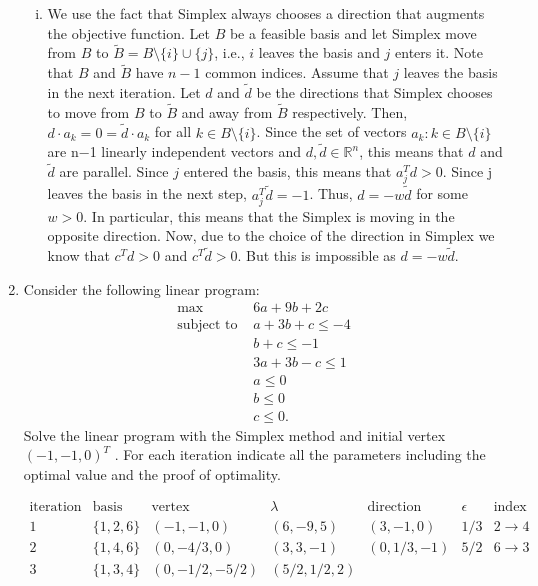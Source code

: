 \documentclass[11pt]{article}
\newcommand{\setR}{\mathbb{R}}
\begin{document}
\begin{enumerate}[1)]
\begin{solution}
\begin{enumerate}[i)]
  \item We use the fact that Simplex always chooses a direction that augments the objective function. Let $B$ be a feasible basis and let Simplex move from $B$ to
$\tilde{B}= B \setminus \{i\} \cup \{j\}$, i.e., $i$ leaves the basis and $j$ enters it. Note that $B$ and
$\tilde{B}$ have $n−1$ common indices. Assume that $j$ leaves the basis in the next iteration. Let $d$ and
$\tilde{d}$ be the directions that Simplex chooses to move from $B$ to $\tilde{B}$ and away from $\tilde{B}$ respectively. Then, $d\cdot a_k = 0 = \tilde{d}\cdot a_k$ for all $ k ∈B\setminus\{i\}$. Since the set of vectors $a_k : k ∈B\setminus\{i\}$ are n−1 linearly independent vectors and $d, \tilde{d} ∈\setR^n$, this means that $d$ and $\tilde{d}$ are parallel. Since $j$ entered the basis, this means that $a_j^T d>0$. Since j leaves the basis in the next step, $a^T_j \tilde{d}=−1$. Thus, $d= -w \tilde{d}$ for some $w >0$. In particular, this means that the Simplex is moving in the opposite direction. Now, due to the choice of the direction in Simplex we know that $c^Td>0$ and $c^T\tilde{d}>0$. But this is impossible as $d = -w \tilde{d}$. 
  \end{enumerate}
  
  \end{solution}
  
  
\item Consider the following linear program:
\begin{align*}
\max  \quad & 6a+ 9b+ 2c \\
\text{subject to } & a+ 3b+ c ≤−4 \\
&b+ c ≤−1 \\
& 3a+ 3b−c ≤1 \\
& a ≤0  \\
& b ≤0 \\
& c ≤0. 
\end{align*}
Solve the linear program with the Simplex method and initial vertex $(−1,−1,0)^T$ . For each iteration indicate all the parameters including the optimal value and the proof of optimality.

\begin{solution}
$$\begin{matrix}  \text{iteration} & \text{basis} & \text{vertex} & \lambda & \text{direction} & \epsilon & \text{index exchange} \\
1 & \{1, 2, 6\} & (-1, -1, 0) & (6, -9, 5) & (3, -1, 0) & 1/3 & 2\rightarrow 4 \\
2 & \{1, 4, 6\} & (0, -4/3, 0) & (3, 3, -1) & (0, 1/3, -1) & 5/2 & 6 \rightarrow 3 \\
3 & \{1, 3, 4\} & (0, -1/2, -5/2) & (5/2, 1/2, 2)  \end{matrix}$$


\end{solution}
\end{enumerate}
\end{document}
